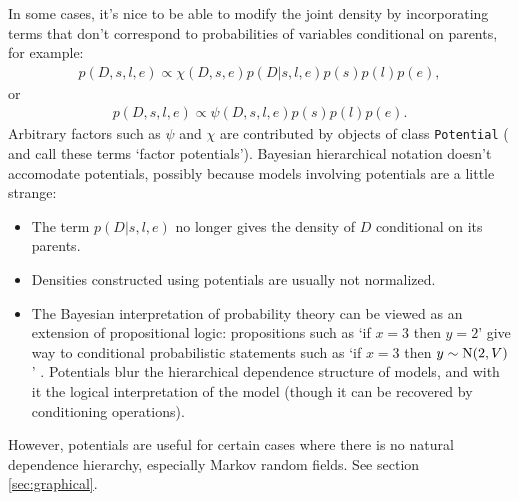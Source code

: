 In some cases, it's nice to be able to modify the joint density by incorporating terms that don't correspond to probabilities of variables conditional on parents, for example:
\begin{eqnarray*}
    p(D,s,l,e) \propto \chi(D,s,e) p(D|s,l,e) p(s) p(l) p(e),
\end{eqnarray*}
or
\begin{eqnarray*}
    p(D,s,l,e) \propto \psi(D,s,l,e) p(s) p(l) p(e).
\end{eqnarray*}
Arbitrary factors such as $\psi$ and $\chi$ are contributed by objects of class \texttt{Potential} (\cite{dawidmarkov} and \cite{jordangraphical} call these terms `factor potentials'). Bayesian hierarchical notation doesn't accomodate potentials, possibly because models involving potentials are a little strange:
\begin{itemize}
    \item The term $p(D|s,l,e)$ no longer gives the density of $D$ conditional on its parents.
    \item Densities constructed using potentials are usually not normalized.
    \item The Bayesian interpretation of probability theory can be viewed as an extension of propositional logic: propositions such as `if $x=3$ then $y=2$' give way to conditional probabilistic statements such as `if $x=3$ then $y\sim\textup N(2,V)$' \cite{jaynes}. Potentials blur the hierarchical dependence structure of models, and with it the logical interpretation of the model (though it can be recovered by conditioning operations).
\end{itemize}
However, potentials are useful for certain cases where there is no natural dependence hierarchy, especially Markov random fields. See section \ref{sec:graphical}.

